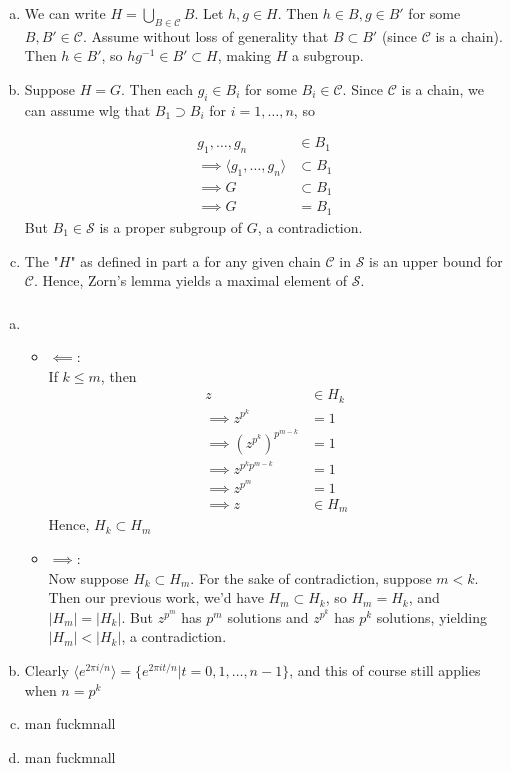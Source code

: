 \documentclass{article}
\newcommand{\set}[1]{ \{ #1 \} }
\newcommand{\inv}[1]{ {#1}^{-1} }
\newcommand{\norm}[1]{|#1|}
\newcommand{\cyclic}[1]{\langle#1\rangle}
\begin{document}
\subsubsection{}\label{ex4p17}
\newcommand{\chain}{\mathcal{C}}
\begin{enumerate}[(a)]
\item
	We can write $H=\bigcup_{B\in\chain} B$. Let $h,g\in H$. Then $h\in B,g\in B'$ for some $B,B'\in\chain$. Assume without loss of generality that $B\subset B'$ (since $\chain$ is a chain). Then $h\in B'$, so $h\inv{g} \in B' \subset H$, making $H$ a subgroup.
\item
	Suppose $H=G$. Then each $g_i \in B_i$ for some $B_i\in\chain$. Since $\chain$ is a chain, we can assume wlg that $B_1 \supset B_i$ for $i=1,\ldots,n$, so

\begin{align*}
g_1,\ldots,g_n &\in B_1\\
\implies \cyclic{g_1,\ldots,g_n} &\subset B_1\\
\implies G &\subset B_1\\
\implies G &= B_1
\end{align*}
But $B_1 \in \mathcal{S}$ is a proper subgroup of $G$, a contradiction.
\item
	The "$H$" as defined in part a for any given chain $\chain$ in $\mathcal{S}$ is an upper bound for $\chain$. Hence, Zorn's lemma yields a maximal element of $\mathcal{S}$.
\end{enumerate}
\subsubsection{}\label{ex4p18}
\begin{enumerate}[(a)]
\item
\begin{itemize}
	\item $\impliedby$:\\
	If $k\leq m$, then 
	\begin{align*}
	z &\in H_k\\
	\implies z^{p^k} &=1\\
	\implies (z^{p^k})^{p^{m-k}} &= 1\\
	\implies z^{p^kp^{m-k}} &= 1\\
	\implies z^{p^m} &= 1\\
	\implies z &\in H_m
	\end{align*}
	Hence, $H_k \subset H_m$\\
	\item $\implies$:\\
	Now suppose $H_k \subset H_m$. For the sake of contradiction, suppose $m < k$. Then our previous work, we'd have $H_m \subset H_k$, so $H_m=H_k$, and $\norm{H_m}=\norm{H_k}$. But $z^{p^m}$ has $p^m$ solutions and $z^{p^k}$ has $p^k$ solutions, yielding $\norm{H_m}<\norm{H_k}$, a contradiction.
\end{itemize}
\item Clearly $\cyclic{e^{2\pi i/n}} = \set{e^{2\pi it/n} | t=0,1,\ldots,n-1}$, and this of course still applies when $n=p^k$
\item man fuckmnall
\item man fuckmnall
\end{enumerate} 
\end{document}
